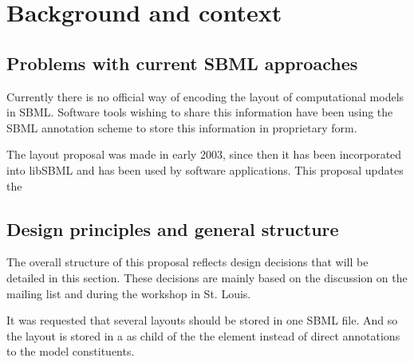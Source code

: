 \section{Background and context}
\label{background}
\subsection{Problems with current SBML approaches}
Currently there is no official way of encoding the layout of computational models in SBML. Software tools wishing to share this information have been using the SBML annotation scheme to store this information in proprietary form. 

The layout proposal was made in early 2003, since then it has been incorporated into libSBML and has been used by software applications. This proposal updates the 


\subsection{Design principles and general structure}

The overall structure of this proposal reflects design decisions that will be detailed in this section. These decisions are mainly based on the discussion on the mailing list and during the workshop in St. Louis.
 
It was requested that several layouts should be stored in one SBML file. And so the layout is stored in a \ListOfLayouts as child of the the \Model element instead of direct annotations to the model constituents.


